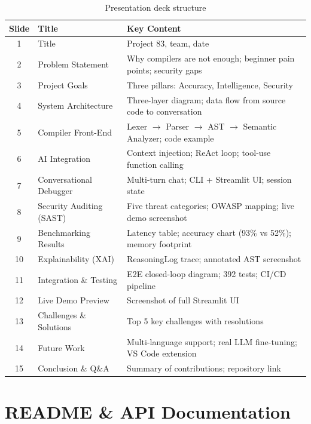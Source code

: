 \documentclass[a4paper,11pt]{article}
\begin{document}
\begin{table}[h]
\centering
\begin{tabularx}{\textwidth}{|c|l|X|}
\hline
\rowcolor{cyan!10}
\textbf{Slide} & \textbf{Title} & \textbf{Key Content} \\
\hline
1 & Title & Project 83, team, date \\
2 & Problem Statement & Why compilers are not enough; beginner pain points; security gaps \\
3 & Project Goals & Three pillars: Accuracy, Intelligence, Security \\
4 & System Architecture & Three-layer diagram; data flow from source code to conversation \\
5 & Compiler Front-End & Lexer $\to$ Parser $\to$ AST $\to$ Semantic Analyzer; code example \\
6 & AI Integration & Context injection; ReAct loop; tool-use function calling \\
7 & Conversational Debugger & Multi-turn chat; CLI + Streamlit UI; session state \\
8 & Security Auditing (SAST) & Five threat categories; OWASP mapping; live demo screenshot \\
9 & Benchmarking Results & Latency table; accuracy chart (93\% vs 52\%); memory footprint \\
10 & Explainability (XAI) & ReasoningLog trace; annotated AST screenshot \\
11 & Integration \& Testing & E2E closed-loop diagram; 392 tests; CI/CD pipeline \\
12 & Live Demo Preview & Screenshot of full Streamlit UI \\
13 & Challenges \& Solutions & Top 5 key challenges with resolutions \\
14 & Future Work & Multi-language support; real LLM fine-tuning; VS Code extension \\
15 & Conclusion \& Q\&A & Summary of contributions; repository link \\
\hline
\end{tabularx}
\caption{Presentation deck structure}
\end{table}

\section{README \& API Documentation}
\end{document}
